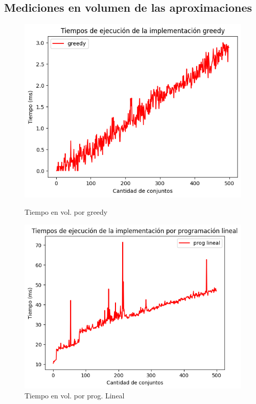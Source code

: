 \subsection{Mediciones en volumen de las aproximaciones}
\begin{figure}[H]
    \begin{minipage}{0.5\textwidth}
        \centering
        \includegraphics[width=\linewidth]{graficos/greedvol.png}
        \caption{Tiempo en vol. por greedy}
        \label{fig:imagen1}
    \end{minipage}%
    \begin{minipage}{0.5\textwidth}
        \centering
        \includegraphics[width=\linewidth]{graficos/plvol.png}
        \caption{Tiempo en vol. por prog. Lineal}
        \label{fig:imagen2}
    \end{minipage}
\end{figure}

